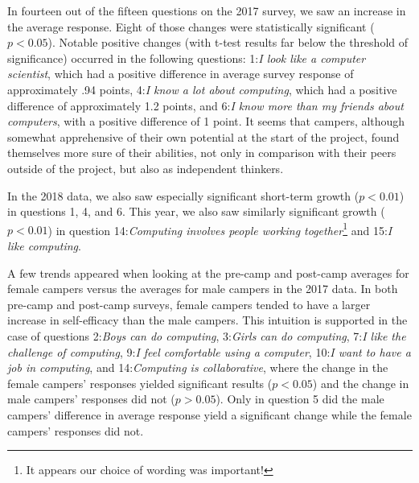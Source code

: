 In fourteen out of the fifteen questions on the 2017 survey, we saw
an increase in the average response.  Eight of those changes were
statistically significant ($p < 0.05$). Notable positive changes
(with t-test results far below the threshold of significance)
occurred in the following questions: 1:\textit{I look like a computer
scientist}, which had a positive difference in average survey
response of approximately
.94 points, 4:\textit{I know a lot about computing}, which had a positive
difference of approximately 1.2 points, and 6:\textit{I know more
than my friends about computers}, with a positive difference of 1
point.  It seems that campers, although somewhat apprehensive of
their own potential at the start of the project, found themselves
more sure of their abilities, not only in comparison with their
peers outside of the project, but also as independent thinkers.

In the 2018 data, we also saw especially significant short-term
growth ($p < 0.01$) in questions 1, 4, and 6.  This year, we also
saw similarly significant growth ($p < 0.01$) in question
14:\textit{Computing involves people working together}\footnote{It
appears our choice of wording was important!} and 15:\textit{I like
computing}.


A few trends appeared when looking at the pre-camp and post-camp
averages for female campers versus the averages for male campers
in the 2017 data.  In both pre-camp and post-camp surveys, female
campers tended to have a larger increase in self-efficacy than the
male campers. This intuition is supported in the case of questions
2:\textit{Boys can do computing}, 3:\textit{Girls can do computing},
7:\textit{I like the challenge of computing}, 9:\textit{I feel
comfortable using a computer}, 10:\textit{I want to have a job in
computing}, and 14:\textit{Computing is collaborative}, where the
change in the female campers' responses yielded significant results
($p < 0.05$) and the change in male campers' responses did not ($p
> 0.05$). Only in question 5 did the male campers' difference in
average response yield a significant change while the female campers'
responses did not.

